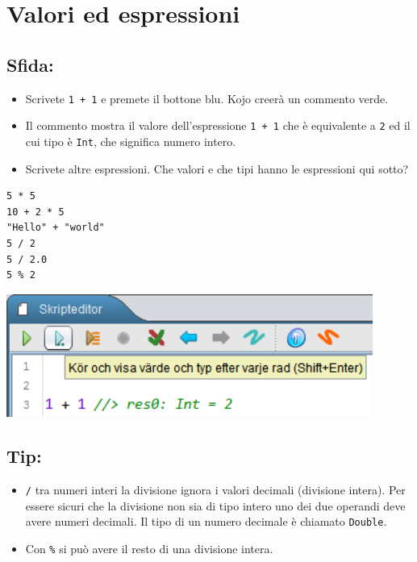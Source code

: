 \chapter{Valori ed espressioni}
\begin{multicols}{2}
\section*{\color{BrickRed}Sfida:}


\begin{itemize}

\item {Scrivete \lstinline{1 + 1} e premete il bottone blu. Kojo creerà un commento verde.}
\item {Il commento mostra il valore dell'espressione \lstinline{1 + 1} che è equivalente a \lstinline{2} ed il cui tipo è \lstinline{Int}, che significa numero intero.}
\item {Scrivete altre espressioni. Che valori e che tipi hanno le espressioni qui sotto?}

\end{itemize}



\begin{lstlisting}[numbers=none]
5 * 5
10 + 2 * 5
"Hello" + "world"
5 / 2
5 / 2.0
5 % 2
\end{lstlisting}
        


\columnbreak


\includegraphics[width=12.0cm]{../img/show-value.png}
\section*{\color{OliveGreen}Tip:}


\begin{itemize}

\item {\lstinline{/} tra numeri interi la divisione ignora i valori decimali (divisione intera). Per essere sicuri che la divisione non sia di tipo intero uno dei due operandi deve avere numeri decimali. Il tipo di un numero decimale è chiamato \lstinline{Double}.}
\item {Con \lstinline{%} si può avere il resto di una divisione intera.}

\end{itemize}


\end{multicols}

